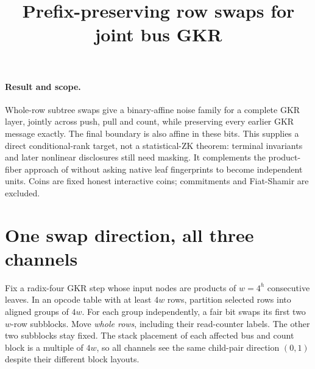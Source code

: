 \documentclass[11pt]{article}
\title{Prefix-preserving row swaps for joint bus GKR}
\author{}
\date{}
\begin{document}
\maketitle
\vspace{-2em}

\paragraph{Result and scope.} Whole-row subtree swaps give a binary-affine noise family for a complete GKR layer, jointly across push, pull and count, while preserving every earlier GKR message exactly. The final boundary is also affine in these bits. This supplies a direct conditional-rank target, not a statistical-ZK theorem: terminal invariants and later nonlinear disclosures still need masking. It complements the product-fiber approach of  without asking native leaf fingerprints to become independent units. Coins are fixed honest interactive coins; commitments and Fiat-Shamir are excluded.

\section{One swap direction, all three channels}

Fix a radix-four GKR step whose input nodes are products of $w=4^h$ consecutive leaves. In an opcode table with at least $4w$ rows, partition selected rows into aligned groups of $4w$. For each group independently, a fair bit swaps its first two $w$-row subblocks. Move \emph{whole rows}, including their read-counter labels. The other two subblocks stay fixed. The stack placement of each affected bus and count block is a multiple of $4w$, so all channels see the same child-pair direction $(0,1)$ despite their different block layouts.
\end{document}
